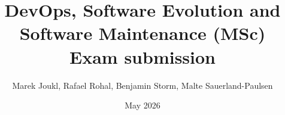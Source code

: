 \usepackage{graphicx}
\usepackage{fancyhdr}

\title{DevOps, Software Evolution and Software Maintenance (MSc) \\ Exam submission}
\author{Marek Joukl, Rafael Rohal, Benjamin Storm, Malte Sauerland-Paulsen}
\date{May 2026}


\pagestyle{fancy}
\fancyhf{}
\fancyfoot[C]{\thepage}

\renewcommand{\headrulewidth}{0pt}
\renewcommand{\footrulewidth}{0pt}

